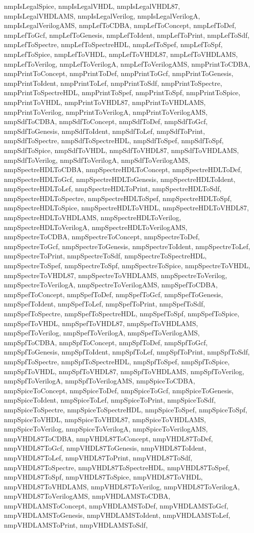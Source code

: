 {{nmpIsLegalSpice, nmpIsLegalVHDL, nmpIsLegalVHDL87, nmpIsLegalVHDLAMS, nmpIsLegalVerilog, nmpIsLegalVerilogA, nmpIsLegalVerilogAMS, nmpLefToCDBA, nmpLefToConcept, nmpLefToDef, nmpLefToGcf, nmpLefToGenesis, nmpLefToIdent, nmpLefToPrint, nmpLefToSdf, nmpLefToSpectre, nmpLefToSpectreHDL, nmpLefToSpef, nmpLefToSpf, nmpLefToSpice, nmpLefToVHDL, nmpLefToVHDL87, nmpLefToVHDLAMS, nmpLefToVerilog, nmpLefToVerilogA, nmpLefToVerilogAMS, nmpPrintToCDBA, nmpPrintToConcept, nmpPrintToDef, nmpPrintToGcf, nmpPrintToGenesis, nmpPrintToIdent, nmpPrintToLef, nmpPrintToSdf, nmpPrintToSpectre, nmpPrintToSpectreHDL, nmpPrintToSpef, nmpPrintToSpf, nmpPrintToSpice, nmpPrintToVHDL, nmpPrintToVHDL87, nmpPrintToVHDLAMS, nmpPrintToVerilog, nmpPrintToVerilogA, nmpPrintToVerilogAMS, nmpSdfToCDBA, nmpSdfToConcept, nmpSdfToDef, nmpSdfToGcf, nmpSdfToGenesis, nmpSdfToIdent, nmpSdfToLef, nmpSdfToPrint, nmpSdfToSpectre, nmpSdfToSpectreHDL, nmpSdfToSpef, nmpSdfToSpf, nmpSdfToSpice, nmpSdfToVHDL, nmpSdfToVHDL87, nmpSdfToVHDLAMS, nmpSdfToVerilog, nmpSdfToVerilogA, nmpSdfToVerilogAMS, nmpSpectreHDLToCDBA, nmpSpectreHDLToConcept, nmpSpectreHDLToDef, nmpSpectreHDLToGcf, nmpSpectreHDLToGenesis, nmpSpectreHDLToIdent, nmpSpectreHDLToLef, nmpSpectreHDLToPrint, nmpSpectreHDLToSdf, nmpSpectreHDLToSpectre, nmpSpectreHDLToSpef, nmpSpectreHDLToSpf, nmpSpectreHDLToSpice, nmpSpectreHDLToVHDL, nmpSpectreHDLToVHDL87, nmpSpectreHDLToVHDLAMS, nmpSpectreHDLToVerilog, nmpSpectreHDLToVerilogA, nmpSpectreHDLToVerilogAMS, nmpSpectreToCDBA, nmpSpectreToConcept, nmpSpectreToDef, nmpSpectreToGcf, nmpSpectreToGenesis, nmpSpectreToIdent, nmpSpectreToLef, nmpSpectreToPrint, nmpSpectreToSdf, nmpSpectreToSpectreHDL, nmpSpectreToSpef, nmpSpectreToSpf, nmpSpectreToSpice, nmpSpectreToVHDL, nmpSpectreToVHDL87, nmpSpectreToVHDLAMS, nmpSpectreToVerilog, nmpSpectreToVerilogA, nmpSpectreToVerilogAMS, nmpSpefToCDBA, nmpSpefToConcept, nmpSpefToDef, nmpSpefToGcf, nmpSpefToGenesis, nmpSpefToIdent, nmpSpefToLef, nmpSpefToPrint, nmpSpefToSdf, nmpSpefToSpectre, nmpSpefToSpectreHDL, nmpSpefToSpf, nmpSpefToSpice, nmpSpefToVHDL, nmpSpefToVHDL87, nmpSpefToVHDLAMS, nmpSpefToVerilog, nmpSpefToVerilogA, nmpSpefToVerilogAMS, nmpSpfToCDBA, nmpSpfToConcept, nmpSpfToDef, nmpSpfToGcf, nmpSpfToGenesis, nmpSpfToIdent, nmpSpfToLef, nmpSpfToPrint, nmpSpfToSdf, nmpSpfToSpectre, nmpSpfToSpectreHDL, nmpSpfToSpef, nmpSpfToSpice, nmpSpfToVHDL, nmpSpfToVHDL87, nmpSpfToVHDLAMS, nmpSpfToVerilog, nmpSpfToVerilogA, nmpSpfToVerilogAMS, nmpSpiceToCDBA, nmpSpiceToConcept, nmpSpiceToDef, nmpSpiceToGcf, nmpSpiceToGenesis, nmpSpiceToIdent, nmpSpiceToLef, nmpSpiceToPrint, nmpSpiceToSdf, nmpSpiceToSpectre, nmpSpiceToSpectreHDL, nmpSpiceToSpef, nmpSpiceToSpf, nmpSpiceToVHDL, nmpSpiceToVHDL87, nmpSpiceToVHDLAMS, nmpSpiceToVerilog, nmpSpiceToVerilogA, nmpSpiceToVerilogAMS, nmpVHDL87ToCDBA, nmpVHDL87ToConcept, nmpVHDL87ToDef, nmpVHDL87ToGcf, nmpVHDL87ToGenesis, nmpVHDL87ToIdent, nmpVHDL87ToLef, nmpVHDL87ToPrint, nmpVHDL87ToSdf, nmpVHDL87ToSpectre, nmpVHDL87ToSpectreHDL, nmpVHDL87ToSpef, nmpVHDL87ToSpf, nmpVHDL87ToSpice, nmpVHDL87ToVHDL, nmpVHDL87ToVHDLAMS, nmpVHDL87ToVerilog, nmpVHDL87ToVerilogA, nmpVHDL87ToVerilogAMS, nmpVHDLAMSToCDBA, nmpVHDLAMSToConcept, nmpVHDLAMSToDef, nmpVHDLAMSToGcf, nmpVHDLAMSToGenesis, nmpVHDLAMSToIdent, nmpVHDLAMSToLef, nmpVHDLAMSToPrint, nmpVHDLAMSToSdf, }}
